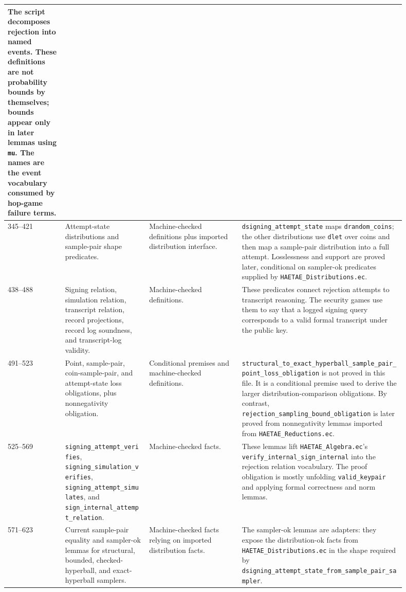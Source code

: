 \documentclass[11pt]{report}
\DeclareRobustCommand{\file}[1]{\ifmmode\text{\nolinkurl{#1}}\else\nolinkurl{#1}\fi}
\DeclareRobustCommand{\ec}[1]{\ifmmode\text{\nolinkurl{#1}}\else\nolinkurl{#1}\fi}
\theoremstyle{definition}
\theoremstyle{plain}
\begin{document}
\begin{longtable}{p{0.13\linewidth}p{0.19\linewidth}p{0.21\linewidth}p{0.37\linewidth}}
The script decomposes rejection into named events.  These definitions are not
probability bounds by themselves; bounds appear only in later lemmas using
\ec{mu}.  The names are the event vocabulary consumed by hop-game failure
terms. \\
\midrule
345--421 &
Attempt-state distributions and sample-pair shape predicates. &
Machine-checked definitions plus imported distribution interface. &
\ec{dsigning\_attempt\_state} maps \ec{drandom\_coins}; the other
distributions use \ec{dlet} over coins and then map a sample-pair
distribution into a full attempt.  Losslessness and support are proved later,
conditional on sampler-ok predicates supplied by \file{HAETAE\_Distributions.ec}. \\
\midrule
438--488 &
Signing relation, simulation relation, transcript relation, record
projections, record log soundness, and transcript-log validity. &
Machine-checked definitions. &
These predicates connect rejection attempts to transcript reasoning.  The
security games use them to say that a logged signing query corresponds to a
valid formal transcript under the public key. \\
\midrule
491--523 &
Point, sample-pair, coin-sample-pair, and attempt-state loss obligations, plus
nonnegativity obligation. &
Conditional premises and machine-checked definitions. &
\ec{structural\_to\_exact\_hyperball\_sample\_pair\_point\_loss\_obligation}
is not proved in this file.  It is a conditional premise used to derive the
larger distribution-comparison obligations.  By contrast,
\ec{rejection\_sampling\_bound\_obligation} is later proved from nonnegativity
lemmas imported from \file{HAETAE\_Reductions.ec}. \\
\midrule
525--569 &
\ec{signing\_attempt\_verifies},
\ec{signing\_simulation\_verifies},
\ec{signing\_attempt\_simulates}, and
\ec{sign\_internal\_attempt\_relation}. &
Machine-checked facts. &
These lemmas lift \file{HAETAE\_Algebra.ec}'s
\ec{verify\_internal\_sign\_internal} into the rejection relation vocabulary.
The proof obligation is mostly unfolding \ec{valid\_keypair} and applying
formal correctness and norm lemmas. \\
\midrule
571--623 &
Current sample-pair equality and sampler-ok lemmas for structural, bounded,
checked-hyperball, and exact-hyperball samplers. &
Machine-checked facts relying on imported distribution facts. &
The sampler-ok lemmas are adapters: they expose the distribution-ok facts from
\file{HAETAE\_Distributions.ec} in the shape required by
\ec{dsigning\_attempt\_state\_from\_sample\_pair\_sampler}. \\

\end{longtable}
\end{document}
